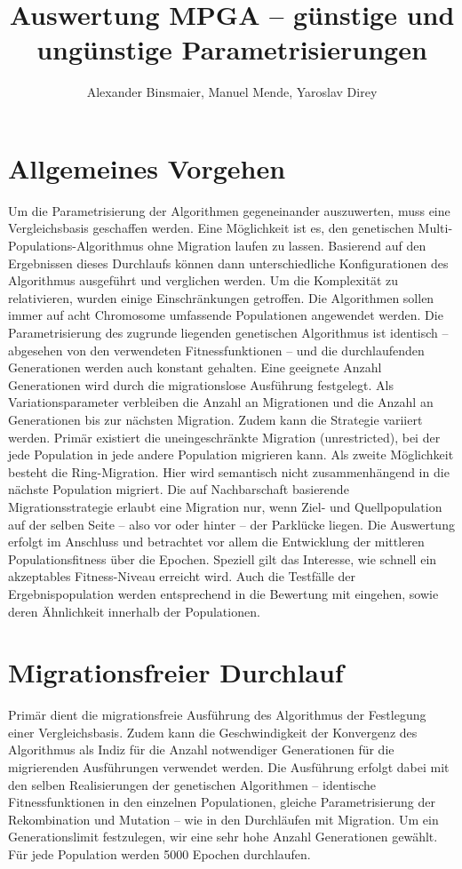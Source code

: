 \documentclass[12pt,a4paper]{article}
\author{Alexander Binsmaier, Manuel Mende, Yaroslav Direy}
\title{Auswertung MPGA -- günstige und ungünstige Parametrisierungen}
\begin{document}
\maketitle
\tableofcontents
\section{Allgemeines Vorgehen}
Um die Parametrisierung der Algorithmen gegeneinander auszuwerten, muss eine Vergleichsbasis geschaffen werden. Eine Möglichkeit ist es, den genetischen Multi-Populations-Algorithmus ohne Migration laufen zu lassen. Basierend auf den Ergebnissen dieses Durchlaufs können dann unterschiedliche Konfigurationen des Algorithmus ausgeführt und verglichen werden. Um die Komplexität zu relativieren, wurden einige Einschränkungen getroffen. Die Algorithmen sollen immer auf acht Chromosome umfassende Populationen angewendet werden. Die Parametrisierung des zugrunde liegenden genetischen Algorithmus ist identisch -- abgesehen von den verwendeten Fitnessfunktionen -- und die durchlaufenden Generationen werden auch konstant gehalten. Eine geeignete Anzahl Generationen wird durch die migrationslose Ausführung festgelegt. Als Variationsparameter verbleiben die Anzahl an Migrationen und die Anzahl an Generationen bis zur nächsten Migration. Zudem kann die Strategie variiert werden.
Primär existiert die uneingeschränkte Migration (unrestricted), bei der jede Population in jede andere Population migrieren kann. Als zweite Möglichkeit besteht die Ring-Migration. Hier wird semantisch nicht zusammenhängend in die nächste Population migriert. Die auf Nachbarschaft basierende Migrationsstrategie erlaubt eine Migration nur, wenn Ziel- und Quellpopulation auf der selben Seite -- also vor oder hinter -- der Parklücke liegen. 
Die Auswertung erfolgt im Anschluss und betrachtet vor allem die Entwicklung der mittleren Populationsfitness über die Epochen. Speziell gilt das Interesse, wie schnell ein akzeptables Fitness-Niveau erreicht wird. Auch die Testfälle der Ergebnispopulation werden entsprechend in die Bewertung mit eingehen, sowie deren Ähnlichkeit innerhalb der Populationen.

\section{Migrationsfreier Durchlauf}
Primär dient die migrationsfreie Ausführung des Algorithmus der Festlegung einer Vergleichsbasis. Zudem kann die Geschwindigkeit der Konvergenz des Algorithmus als Indiz für die Anzahl notwendiger Generationen für die migrierenden Ausführungen verwendet werden. Die Ausführung erfolgt dabei mit den selben Realisierungen der genetischen Algorithmen -- identische Fitnessfunktionen in den einzelnen Populationen, gleiche Parametrisierung der Rekombination und Mutation -- wie in den Durchläufen mit Migration. Um ein Generationslimit festzulegen, wir eine sehr hohe Anzahl Generationen gewählt. Für jede Population werden 5000 Epochen durchlaufen.
\end{document}
